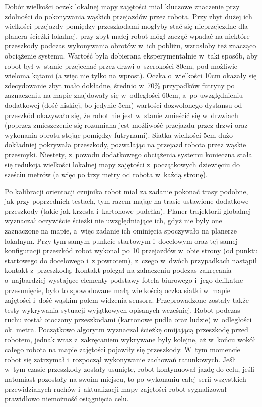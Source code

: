 Dobór wielkości oczek lokalnej mapy zajętości miał kluczowe znaczenie przy zdolności
do pokonywania wąskich przejazdów przez robota. Przy zbyt dużej ich wielkości
przejazdy pomiędzy przeszkodami mogłyby stać się nieprzejezdne dla planera 
ścieżki lokalnej, przy zbyt małej robot mógł zacząć wpadać na niektóre przeszkody
podczas wykonywania obrotów w~ich pobliżu, wzrosłoby też znacząco obciążenie
systemu. Wartość była dobierana eksperymentalnie w~taki sposób, aby robot był
w~stanie przejechać przez drzwi o~szerokości 80cm, pod możliwie wieloma kątami
(a więc nie tylko na wprost). Oczka o~wielkości 10cm okazały się zdecydowanie 
zbyt mało dokładne, średnio w~70\% przypadków futryny po zaznaczeniu na mapie 
znajdowały się w~odległości 60cm, a~po uwzględnieniu dodatkowej (dość niskiej, 
bo jedynie 5cm) wartości dozwolonego dystansu od przeszkód okazywało się, że
robot nie jest w~stanie zmieścić się w~drzwiach (poprzez zmieszczenie się
rozumiana jest możliwość przejazdu przez drzwi oraz wykonania obrotu stojąc 
pomiędzy futrynami). Siatka wielkości 5cm dużo dokładniej pokrywała przeszkody,
pozwalając na przejazd robota przez wąskie przesmyki. Niestety, z~powodu dodatkowego 
obciążenia systemu konieczna stała się redukcja wielkości lokalnej mapy zajętości
z~początkowych dziewięciu do sześciu metrów (a więc po trzy metry od robota 
w~każdą stronę). 

Po kalibracji orientacji czujnika robot miał za zadanie pokonać trasy podobne,
jak przy poprzednich testach, tym razem mając na trasie ustawione dodatkowe
przeszkody (takie jak krzesła i~kartonowe pudełka). Planer trajektorii 
globalnej wyznaczał oczywiście ścieżki nie uwzględniające ich, gdyż nie 
były one zaznaczone na mapie, a~więc zadanie ich ominięcia spoczywało na
planerze lokalnym. Przy tym samym punkcie startowym i~docelowym oraz tej 
samej konfiguracji przeszkód robot wykonał po 10 przejazdów w~obie strony 
(od punktu startowego do docelowego i~z powrotem), z~czego w~dwóch przypadkach 
nastąpił kontakt z~przeszkodą. Kontakt polegał na zahaczeniu podczas zakręcania
o~najbardziej wystające elementy podstawy fotela biurowego i~jego delikatne 
przesunięcie, było to spowodowane małą wielkością oczka siatki w~mapie zajętości
i~dość wąskim polem widzenia sensora. Przeprowadzone zostały także testy 
wykrywania sytuacji wyjątkowych opisanych wcześniej. Robot podczas ruchu 
został otoczony przeszkodami (kartonowe pudła oraz ludzie) w~odległości 
ok. metra. Początkowo algorytm wyznaczał ścieżkę omijającą przeszkodę przed 
robotem, jednak wraz z~zakręcaniem wykrywane były kolejne, aż w~końcu wokół
całego robota na mapie zajętości pojawiły się przeszkody. W~tym momencie 
robot się zatrzymał i~rozpoczął wykonywanie zachowań ratunkowych. Jeśli 
w~tym czasie przeszkody zostały usunięte, robot kontynuował jazdę do celu,
jeśli natomiast pozostały na swoim miejscu, to po wykonaniu całej serii 
wszystkich przewidzianych ruchów i~aktualizacji mapy zajętości robot sygnalizował
prawidłowo niemożność osiągnięcia celu. 

